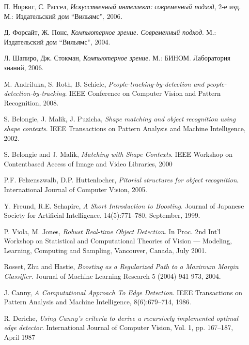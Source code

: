 \begin{thebibliography}{99}

  П. Норвиг, С. Рассел,
  \emph{Искусственный интеллект: современный подход}, 2-е изд.
  М.: Издательский дом ``Вильямс'',
  2006.

  Д. Форсайт, Ж. Понс,
  \emph{Компьютерное зрение. Современный подход}.
  М.: Издательский дом ``Вильямс'',
  2004.

  Л. Шапиро, Дж. Стокман,
  \emph{Компьютерное зрение}.
  М.: БИНОМ. Лаборатория знаний,
  2006.

  M. Andriluka, S. Roth, B. Schiele,
  \emph{People-tracking-by-detection and people-detection-by-tracking}.
  IEEE Conference on Computer Vision and Pattern Recognition,
  2008.

  S. Belongie, J. Malik, J. Puzicha,
  \emph{Shape matching and object recognition using shape contexts}.
  IEEE Transactions on Pattern Analysis and Machine Intelligence,
  2002.

  S. Belongie and J. Malik,
  \emph{Matching with Shape Contexts}.
  IEEE Workshop on Contentbased Access of Image and Video Libraries,
  2000

  P.F. Felzenszwalb, D.P. Huttenlocher,
  \emph{Pitorial structures for object recognition}.
  International Journal of Computer Vision,
  2005.

  Y. Freund, R.E. Schapire,
  \emph{A Short Introduction to Boosting}.
  Journal of Japanese Society for Artificial Intelligence, 14(5):771--780, September,
  1999.

  P. Viola, M. Jones,
  \emph{Robust Real-time Object Detection}.
  In Proc. 2nd Int'l Workshop on Statistical and Computational Theories of Vision --- Modeling, Learning, Computing and Sampling, Vancouver, Canada,
  July 2001.

  Rosset, Zhu and Hastie,
  \emph{Boosting as a Regularized Path to a Maximum Margin Classifier}.
  Journal of Machine Learning Research 5 (2004) 941-973,
  2004.

  J. Canny,
  \emph{A Computational Approach To Edge Detection}.
  IEEE Transactions on Pattern Analysis and Machine Intelligence, 8(6):679–714,
  1986.

  R. Deriche,
  \emph{Using Canny's criteria to derive a recursively implemented optimal edge detector}.
  International Journal of Computer Vision, Vol. 1, pp. 167–187,
  April 1987


\end{thebibliography}
